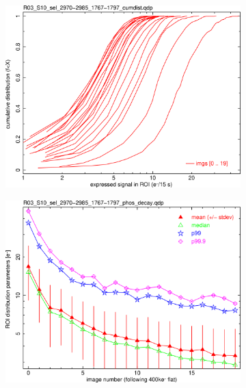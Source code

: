 \begin{figure}[!htbp]
\begin{subfigure}{0.45\textwidth}
  \centering
  \includegraphics[width=\textwidth]{figures/phosphorescence-survey/phos_kinetics/R03_S10_sel_2970-2985_1767-1797_cumdist.png}    
\end{subfigure}
\hfil
\begin{subfigure}{0.45\textwidth}
  \centering
  \includegraphics[width=\textwidth]{figures/phosphorescence-survey/phos_kinetics/R03_S10_sel_2970-2985_1767-1797_phos_decay.png}
\end{subfigure}
\newline
\begin{subfigure}{0.45\textwidth}    
  \centering

\end{subfigure}
\end{figure}
